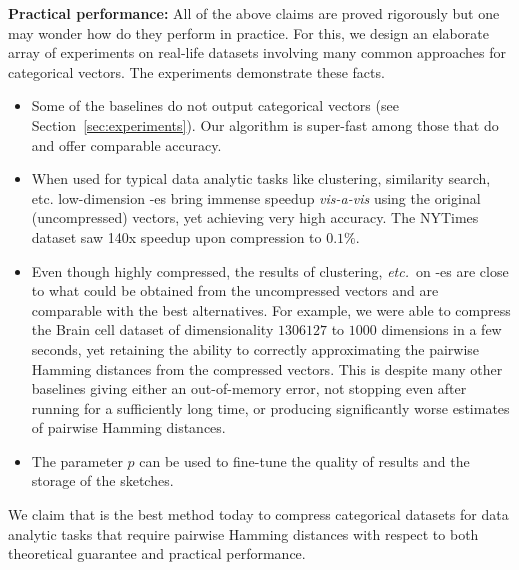 {\bf Practical performance:} All of the above claims are proved rigorously but one may wonder how do they perform in practice.
For this, we design an elaborate array of experiments on real-life datasets involving many common approaches for categorical vectors. The experiments demonstrate these facts.
\begin{itemize}%
    \item Some of the baselines do not output categorical vectors (see Section~\ref{sec:experiments}).   %
    Our \fsketch algorithm is super-fast  among those that do and offer comparable accuracy.
    \item When used for typical data analytic tasks like clustering, similarity search, etc. low-dimension \fsketch-es bring immense speedup {\it vis-a-vis} using the original (uncompressed) vectors, yet achieving very high accuracy. The NYTimes dataset saw 140x speedup upon compression to $0.1\%$.
    \item Even though highly compressed, the results of clustering, {\it etc.}\ on \fsketch-es are close to what could be obtained from the uncompressed vectors and are comparable with the best alternatives. For example, we were able to compress the Brain cell dataset of dimensionality $1306127$ to $1000$ dimensions in a few seconds, yet retaining the ability to correctly approximating the pairwise Hamming distances from the compressed vectors. This is despite many other baselines giving either an out-of-memory error, not stopping even after running for a sufficiently long time, or producing significantly worse estimates of pairwise Hamming distances.
    \item The parameter $p$ can be used to fine-tune the quality of results and the storage of the sketches.
\end{itemize}

We claim that \fsketch is the best method today to compress categorical datasets for data analytic tasks that require pairwise Hamming distances with respect to both theoretical guarantee and practical performance.


